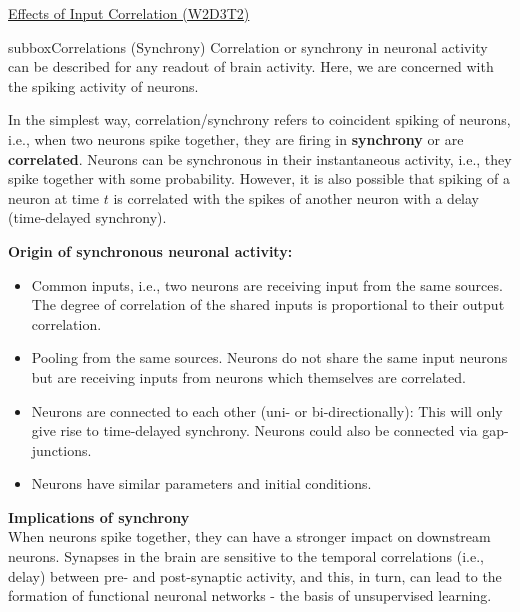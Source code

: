\begin{textbox}{\href{https://compneuro.neuromatch.io/tutorials/W1D4_GeneralizedLinearModels/student/W1D4_Tutorial1.html}{Effects of Input Correlation (W2D3T2)} }
\begin{subbox}{subbox}{Correlations (Synchrony)}
\scriptsize
Correlation or synchrony in neuronal activity can be described for any readout of brain activity. Here, we are concerned with the spiking activity of neurons. 

In the simplest way, correlation/synchrony refers to coincident spiking of neurons, i.e., when two neurons spike together, they are firing in \textbf{synchrony} or are \textbf{correlated}. Neurons can be synchronous in their instantaneous activity, i.e., they spike together with some probability. However, it is also possible that spiking of a neuron at time $t$ is correlated with the spikes of another neuron with a delay (time-delayed synchrony). 

\textbf{Origin of synchronous neuronal activity:}
\begin{itemize}
    \item 
 Common inputs, i.e., two neurons are receiving input from the same sources. The degree of correlation of the shared inputs is proportional to their output correlation.
 \item  Pooling from the same sources. Neurons do not share the same input neurons but are receiving inputs from neurons which themselves are correlated.
 \item  Neurons are connected to each other (uni- or bi-directionally): This will only give rise to time-delayed synchrony. Neurons could also be connected via gap-junctions.
 \item Neurons have similar parameters and initial conditions.
\end{itemize}

\textbf{Implications of synchrony}\\
When neurons spike together, they can have a stronger impact on downstream neurons. Synapses in the brain are sensitive to the temporal correlations (i.e., delay) between pre- and post-synaptic activity, and this, in turn, can lead to the formation of functional neuronal networks - the basis of unsupervised learning.


\end{subbox}
\end{textbox}
